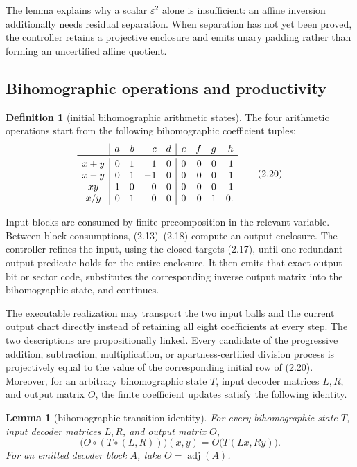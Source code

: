\documentclass[10pt]{article}
\newtheorem{lemma}[theorem]{Lemma}
\theoremstyle{definition}
\newtheorem{definition}[theorem]{Definition}
\theoremstyle{remark}
\begin{document}
The lemma explains why a scalar $\varepsilon^2$ alone is insufficient: an
affine inversion additionally needs residual separation.  When separation
has not yet been proved, the controller retains a projective enclosure and
emits unary padding rather than forming an uncertified affine quotient.

\subsection{Bihomographic operations and productivity}

\begin{definition}[initial bihomographic arithmetic states]
The four arithmetic operations start from the following bihomographic
coefficient tuples:
\[
\begin{array}{c|rrrr|rrrr}
 &a&b&c&d&e&f&g&h\\ \toprule
 x+y&0&1&1&0&0&0&0&1\\
 x-y&0&1&-1&0&0&0&0&1\\
 xy&1&0&0&0&0&0&0&1\\
 x/y&0&1&0&0&0&0&1&0.
\end{array}
\tag{2.20}
\]
\end{definition}

Input blocks are consumed by finite precomposition in the relevant variable.  Between block consumptions, (2.13)--(2.18) compute an output enclosure.  The controller refines the input, using the closed targets (2.17), until one redundant output predicate holds for the entire enclosure.  It then emits that exact output bit or sector code, substitutes the corresponding inverse output matrix into the bihomographic state, and continues.

The executable realization may transport the two input balls and the current
output chart directly instead of retaining all eight coefficients at every
step.  The two descriptions are propositionally linked.  Every candidate of
the progressive addition, subtraction, multiplication, or
apartness-certified division process is projectively equal to the value of
the corresponding initial row of (2.20).  Moreover, for an arbitrary
bihomographic state $T$, input decoder matrices $L,R$, and output matrix $O$,
the finite coefficient updates satisfy the following identity.

\begin{lemma}[bihomographic transition identity]
For every bihomographic state $T$, input decoder matrices $L,R$, and output
matrix $O$,
\[
 \bigl(O\circ(T\circ(L,R))\bigr)(x,y)
   =O\bigl(T(Lx,Ry)\bigr).
\tag{2.21}
\]
For an emitted decoder block $A$, take $O=\operatorname{adj}(A)$.
\end{lemma}
\end{document}
